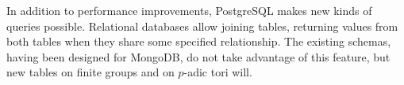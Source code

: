 \documentclass{amsart}
\begin{document}
In addition to performance improvements, PostgreSQL makes new kinds of queries possible.
Relational databases allow joining tables, returning values from both tables when they share some specified relationship.
The existing schemas, having been designed for MongoDB, do not take advantage of this feature, but new tables on finite groups and on $p$-adic tori will.

\end{document}
